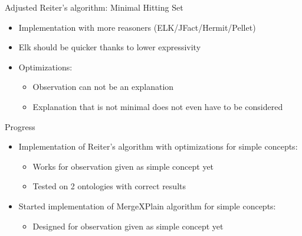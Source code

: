 \documentclass{beamer}
\begin{document}
\begin{frame}{Adjusted Reiter's algorithm: Minimal Hitting Set}
	\begin{itemize}
		\item {
			Implementation with more reasoners (ELK/JFact/Hermit/Pellet)
		}
		
		\item {
			Elk should be quicker thanks to lower expressivity
		}
		
		\item {
			Optimizations: 

			\begin{itemize}
				\item Observation can not be an explanation

				\item Explanation that is not minimal does not even have to be considered
			\end{itemize}
		}
		
	\end{itemize}
\end{frame}

\begin{frame}{Progress}
	\begin{itemize}
		\item Implementation of Reiter's algorithm with optimizations for simple concepts:

		\begin{itemize}
			\item Works for observation given as simple concept yet
			\item Tested on 2 ontologies with correct results
		\end{itemize}		

		\item Started implementation of MergeXPlain algorithm for simple concepts:

		\begin{itemize}
			\item Designed for observation given as simple concept yet
		\end{itemize}
	\end{itemize}
\end{frame}
\end{document}
